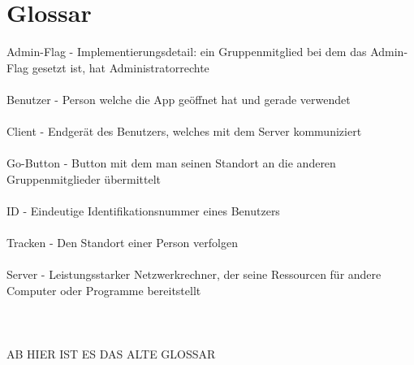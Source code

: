 \section{Glossar}
Admin-Flag - Implementierungsdetail: ein Gruppenmitglied bei dem das Admin-Flag gesetzt ist, hat Administratorrechte\\
\\
Benutzer - Person welche die App geöffnet hat und gerade verwendet\\
\\
Client - Endgerät des Benutzers, welches mit dem Server kommuniziert\\
\\
Go-Button - Button mit dem man seinen Standort an die anderen Gruppenmitglieder übermittelt\\
\\
ID - Eindeutige Identifikationsnummer eines Benutzers\\
\\
Tracken - Den Standort einer Person verfolgen\\
\\
Server - Leistungsstarker Netzwerkrechner, der seine Ressourcen für andere Computer oder Programme bereitstellt
\\ \\ \\ \\
AB HIER IST ES DAS ALTE GLOSSAR

